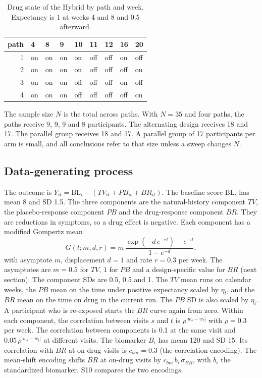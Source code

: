 \documentclass[
  11pt,
]{article}
\begin{document}
\begin{table}

\caption{\label{tab:hybrid-paths}Drug state of the Hybrid by path and week. Expectancy is 1 at weeks 4 and 8 and 0.5 afterward.}
\centering
\begin{tabular}[t]{rllllllll}
\toprule
path & 4 & 8 & 9 & 10 & 11 & 12 & 16 & 20\\
\midrule
1 & on & on & on & on & off & off & on & off\\
2 & on & on & on & on & off & off & off & on\\
3 & on & on & on & off & off & off & on & off\\
4 & on & on & on & off & off & off & off & on\\
\bottomrule
\end{tabular}
\end{table}

The sample size \(N\) is the total across paths. With \(N = 35\) and four paths, the paths receive 9, 9, 9 and 8 participants. The alternating design receives 18 and 17. The parallel group receives 18 and 17. A parallel group of 17 participants per arm is small, and all conclusions refer to that size unless a sweep changes \(N\).

\subsection{Data-generating process}\label{dgp}

The outcome is \(Y_{it} = \mathrm{BL}_i - (TV_{it} + PB_{it} + BR_{it})\). The baseline score \(\mathrm{BL}_i\) has mean 8 and SD 1.5. The three components are the natural-history component \(TV\), the placebo-response component \(PB\) and the drug-response component \(BR\). They are reductions in symptoms, so a drug effect is negative. Each component has a modified Gompertz mean
\[G(t; m, d, r) = m\,\frac{\exp(-d\,e^{-r t}) - e^{-d}}{1 - e^{-d}},\]
with asymptote \(m\), displacement \(d = 1\) and rate \(r = 0.3\) per week. The asymptotes are \(m = 0.5\) for \(TV\), \(1\) for \(PB\) and a design-specific value for \(BR\) (next section). The component SDs are 0.5, 0.5 and 1. The \(TV\) mean runs on calendar weeks, the \(PB\) mean on the time under positive expectancy scaled by \(\eta_t\), and the \(BR\) mean on the time on drug in the current run. The \(PB\) SD is also scaled by \(\eta_t\). A participant who is re-exposed starts the \(BR\) curve again from zero. Within each component, the correlation between visits \(s\) and \(t\) is \(\rho^{|w_s - w_t|}\) with \(\rho = 0.3\) per week. The correlation between components is 0.1 at the same visit and \(0.05\,\rho^{|w_s - w_t|}\) at different visits. The biomarker \(B_i\) has mean 120 and SD 15. Its correlation with \(BR\) at on-drug visits is \(c_{bm} = 0.3\) (the correlation encoding). The mean-shift encoding shifts \(BR\) at on-drug visits by \(c_{bm}\,b_i\,\sigma_{BR}\), with \(b_i\) the standardized biomarker. S10 compares the two encodings.
\end{document}
